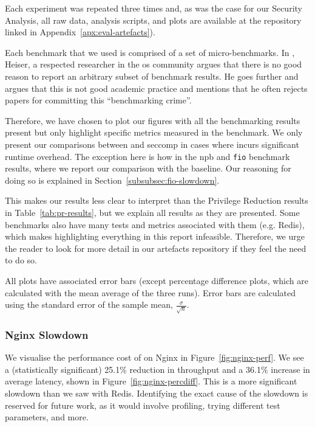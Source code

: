 Each experiment was repeated three times and, as was the case for our Security
Analysis, all raw data, analysis scripts, and plots are available at the
repository linked in Appendix~\ref{apx:eval-artefacts}).

Each benchmark that we used is comprised of a set of micro-benchmarks. In
\textcite{HeiserBenchmarkingCrimes}, Heiser, a respected researcher in the
\ac{os} community argues that there is no good reason to report an arbitrary
subset of benchmark results. He goes further and argues that this is not good
academic practice and mentions that he often rejects papers for committing this
``benchmarking crime''. 

Therefore, we have chosen to plot our figures with all the benchmarking results
present but only highlight specific metrics measured in the benchmark. We
only present our comparisons between \af and seccomp in cases where \af
incurs significant runtime overhead. The exception here is how in the \ac{npb}
and \texttt{fio} benchmark results, where we report our comparison with the
baseline. Our reasoning for doing so is explained in 
Section~\ref{subsubsec:fio-slowdown}. 

This makes our results less clear to interpret than the Privilege Reduction
results in Table~\ref{tab:pr-results}, but we explain all
results as they are presented. Some benchmarks also have many tests
and metrics associated with them (e.g. Redis), which makes highlighting everything in this
report infeasible. Therefore, we urge the reader to look for more detail in our
artefacts repository if they feel the need to do so.

All plots have associated error bars (except percentage difference plots, which
are calculated with the mean average of the three runs). Error bars are
calculated using the standard error of the sample mean, 
$\frac{\sigma}{\sqrt n}$.

\subsubsection{Nginx Slowdown}\label{subsubsec:nginx-slowdown}

We visualise the performance cost of \af on Nginx in
Figure~\ref{fig:nginx-perf}. We see a (statistically significant) 25.1\%
reduction in throughput and a 36.1\% increase in average latency, shown in
Figure~\ref{fig:nginx-percdiff}. This is a more significant slowdown than
we saw with Redis. Identifying the exact cause of the slowdown is reserved
for future work, as it would involve profiling, trying different test
parameters, and more. 

